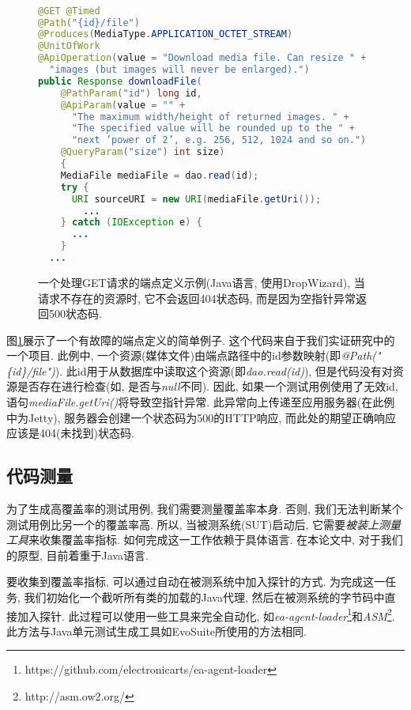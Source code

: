     \begin{figure}
        {
        \tt
        \small
      \begin{lstlisting}[language=java]
@GET @Timed
@Path("{id}/file") 
@Produces(MediaType.APPLICATION_OCTET_STREAM)
@UnitOfWork
@ApiOperation(value = "Download media file. Can resize " +
  "images (but images will never be enlarged).") 
public Response downloadFile(
    @PathParam("id") long id, 
    @ApiParam(value = "" +
      "The maximum width/height of returned images. " + 
      "The specified value will be rounded up to the " + 
      "next ’power of 2’, e.g. 256, 512, 1024 and so on.")
    @QueryParam("size") int size)
    {
    MediaFile mediaFile = dao.read(id); 
    try {
      URI sourceURI = new URI(mediaFile.getUri());
        ...
    } catch (IOException e) {
      ... 
    }
  ...
        \end{lstlisting}
        }
        \caption{一个处理GET请求的端点定义示例(Java语言, 使用DropWizard), 当请求不存在的资源时, 它不会返回404状态码, 而是因为空指针异常返回500状态码. }
        \label{fig3}
    \end{figure}
        
    图\ref{fig3}展示了一个有故障的端点定义的简单例子. 这个代码来自于我们实证研究中的一个项目. 此例中, 一个资源(媒体文件)由端点路径中的id参数映射(即\textit{@Path("\{id\}/file")}). 此id用于从数据库中读取这个资源(即\textit{dao.read(id)}), 但是代码没有对资源是否存在进行检查(如, 是否与\textit{null}不同). 因此, 如果一个测试用例使用了无效id, 语句\textit{mediaFile.getUri()}将导致空指针异常. 此异常向上传递至应用服务器(在此例中为Jetty), 服务器会创建一个状态码为500的HTTP响应, 而此处的期望正确响应应该是404(未找到)状态码. 

    \subsection{代码测量}
    为了生成高覆盖率的测试用例, 我们需要测量覆盖率本身. 否则, 我们无法判断某个测试用例比另一个的覆盖率高. 所以, 当被测系统(SUT)启动后, 它需要\textit{被装上测量工具}来收集覆盖率指标. 如何完成这一工作依赖于具体语言. 在本论文中, 对于我们的原型, 目前着重于Java语言. 
    
    要收集到覆盖率指标, 可以通过自动在被测系统中加入探针的方式. 为完成这一任务, 我们初始化一个截听所有类的加载的Java代理, 然后在被测系统的字节码中直接加入探针. 此过程可以使用一些工具来完全自动化, 如\textit{ea-agent-loader}\footnote{https://github.com/electronicarts/ea-agent-loader}和\textit{ASM}\footnote{http://asm.ow2.org/}. 此方法与Java单元测试生成工具如EvoSuite\cite{fraser2011evosuite}所使用的方法相同. 
    

